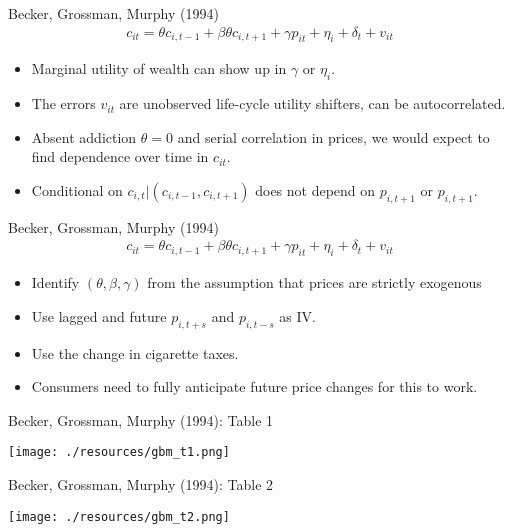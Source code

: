 \documentclass[xcolor=pdftex,dvipsnames,table,mathserif,aspectratio=169]{beamer}
\begin{document}
\begin{frame}{Becker, Grossman, Murphy (1994)}
\begin{align*}
c_{it} = \theta c_{i,t-1} +\beta \theta c_{i,t+1} + \gamma p_{it} + \eta_{i} + \delta_t + v_{it}
\end{align*}
\begin{itemize}
\item Marginal utility of wealth can show up in $\gamma$ or $\eta_i$.
\item The errors $v_{it}$ are unobserved life-cycle utility shifters, can be autocorrelated. 
\item Absent addiction $\theta=0$ and serial correlation in prices, we would expect to find dependence over time in $c_{it}$.
\item Conditional on $c_{i,t}| (c_{i,t-1},c_{i,t+1})$ does not depend on $p_{i,t+1}$ or $p_{i,t+1}$.
\end{itemize}
\end{frame}


\begin{frame}{Becker, Grossman, Murphy (1994)}
\begin{align*}
c_{it} = \theta c_{i,t-1} +\beta \theta c_{i,t+1} + \gamma p_{it} + \eta_{i} + \delta_t + v_{it}
\end{align*}
\begin{itemize}
\item Identify $(\theta,\beta,\gamma)$ from the assumption that prices are strictly exogenous
\item Use lagged and future $p_{i,t+s}$ and $p_{i,t-s}$ as IV. 
\item Use the change in cigarette taxes.
\item Consumers need to fully anticipate \alert{future price changes} for this to work.
\end{itemize}
\end{frame}

\begin{frame}{Becker, Grossman, Murphy (1994): Table 1}
\begin{center}
\texttt{[image: ./resources/gbm\_t1.png]}
\end{center}
\end{frame}

\begin{frame}{Becker, Grossman, Murphy (1994): Table 2}
\begin{center}
\texttt{[image: ./resources/gbm\_t2.png]}
\end{center}
\end{frame}
\end{document}
